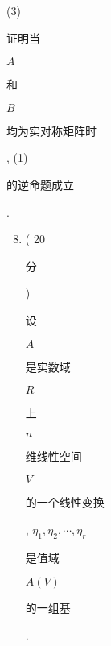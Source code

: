 \documentclass[10pt]{article}
\begin{document}
(3) \begin{CJK}{UTF8}{mj}证明当\end{CJK} $A$ \begin{CJK}{UTF8}{mj}和\end{CJK} $B$ \begin{CJK}{UTF8}{mj}均为实对称矩阵时\end{CJK}, (1) \begin{CJK}{UTF8}{mj}的逆命题成立\end{CJK}.

\begin{enumerate}
  \setcounter{enumi}{7}
  \item ( 20 \begin{CJK}{UTF8}{mj}分\end{CJK}) \begin{CJK}{UTF8}{mj}设\end{CJK} $A$ \begin{CJK}{UTF8}{mj}是实数域\end{CJK} $R$ \begin{CJK}{UTF8}{mj}上\end{CJK} $n$ \begin{CJK}{UTF8}{mj}维线性空间\end{CJK} $V$ \begin{CJK}{UTF8}{mj}的一个线性变换\end{CJK}, $\eta_{1}, \eta_{2}, \cdots, \eta_{r}$ \begin{CJK}{UTF8}{mj}是值域\end{CJK} $A(V)$ \begin{CJK}{UTF8}{mj}的一组基\end{CJK}.
\end{enumerate}
\end{document}
